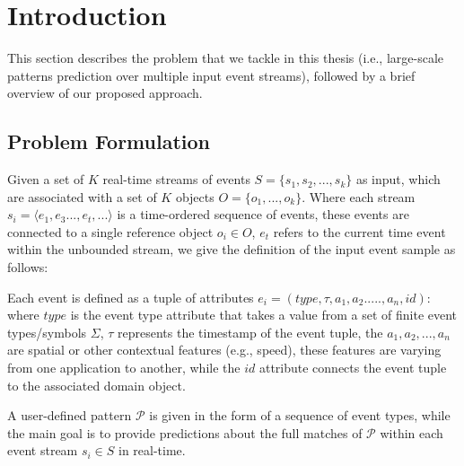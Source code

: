 
\section{Introduction}

This section describes the problem that we tackle in this thesis (i.e., large-scale patterns prediction over multiple input event streams), followed by a brief overview of our proposed approach.

\subsection{Problem Formulation}

Given a set of $K$ real-time streams of events $S = \{ s_1,s_2, ..., s_k\}$ as input, which are associated with a set of $K$  objects $O = \{ o_1, ..., o_k\}$. Where each stream $s_i=\langle e_1,e_3...,e_t,...\rangle$  is a time-ordered sequence of events, these events are connected to a single reference object $o_i \in O$,  $e_t$  refers to the current time event within the unbounded stream, we give the definition of the input event sample as follows:  
\begin{definition}
Each event is defined as a tuple of attributes $e_i = (type,\tau,a_1,a_2.....,a_n,id)$:  where $type$ is the event type attribute that takes a value from a set of finite event types/symbols $\Sigma$, $\tau$ represents the timestamp of the event tuple,  the  $a_1,a_2,...,a_n$ are spatial or other contextual features (e.g., speed), these features are varying from one application to another, while the $id$ attribute connects the event tuple to the associated domain object.
\end{definition}

A user-defined pattern $\mathcal{P}$ is given in the form of a sequence of event types, while the main goal is to provide predictions about the full matches of $\mathcal{P}$ within each event stream $s_i\in S$ in real-time.
 
